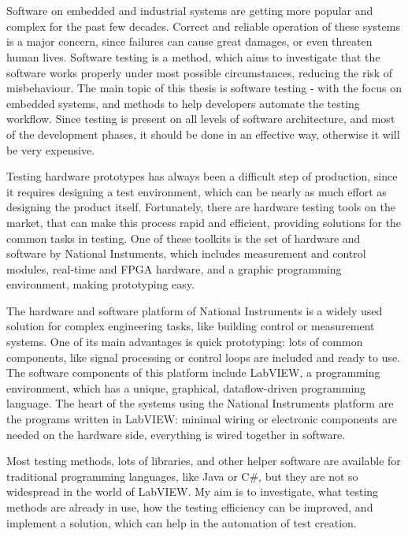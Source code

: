 \chapter{\bevezetes}

Software on embedded and industrial systems are getting more popular and complex for the past few decades. Correct and reliable operation of these systems is a major concern, since failures can cause great damages, or even threaten human lives. Software testing is a method, which aims to investigate that the software works properly under most possible circumstances, reducing the risk of misbehaviour.
The main topic of this thesis is software testing - with the focus on embedded systems, and methods to help developers automate the testing workflow. Since testing is present on all levels of software architecture, and most of the development phases, it should be done in an effective way, otherwise it will be very expensive. 

Testing hardware prototypes has always been a difficult step of production, since it requires designing a test environment, which can be nearly as much effort as designing the product itself. Fortunately, there are hardware testing tools on the market, that can make this process rapid and efficient, providing solutions for the common tasks in testing. One of these toolkits is the set of hardware and software by National Instuments, which includes measurement and control modules, real-time and FPGA hardware, and a graphic programming environment, making prototyping easy.

The hardware and software platform of National Instruments is a widely used solution for complex engineering tasks, like building control or measurement systems. One of its main advantages is quick prototyping: lots of common components, like signal processing or control loops are included and ready to use. The software components of this platform include LabVIEW, a programming environment, which has a unique, graphical, dataflow-driven programming language. The heart of the systems using the National Instruments platform are the programs written in LabVIEW: minimal wiring or electronic components are needed on the hardware side, everything is wired together in software.

Most testing methods, lots of libraries, and other helper software are available for traditional programming languages, like Java or C\#, but they are not so widespread in the world of LabVIEW. My aim is to investigate, what testing methods are already in use, how the testing efficiency can be improved, and implement a solution, which can help in the automation of test creation.
